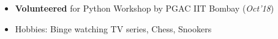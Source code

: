 \documentclass[10pt]{article}
\begin{document}
\colorbox{bl}{}
\vspace{-0.5cm}
\begin{itemize}[leftmargin=0.4cm]
    \item \textbf{Volunteered} for Python Workshop by PGAC IIT Bombay \hfill{(\textit{Oct'18})}\vspace{-0.2cm}
    \item {Hobbies: Binge watching TV series, Chess, Snookers}

    
\end{itemize}

\end{document}
